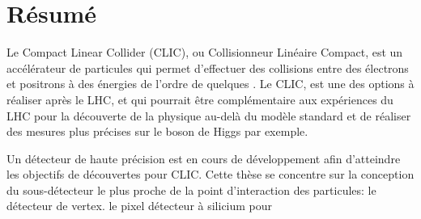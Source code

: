 \chapter*{Résumé}

Le Compact Linear Collider (CLIC), ou Collisionneur Linéaire Compact,
est un accélérateur de particules qui permet d'effectuer des
collisions entre des électrons et positrons à des énergies de l'ordre
de quelques \tev. Le CLIC, est une des options à réaliser après le
LHC, et qui pourrait être complémentaire aux expériences du LHC pour
la découverte de la physique au-delà du modèle standard et de réaliser
des mesures plus précises sur le boson de Higgs par exemple.

Un détecteur de haute précision est en cours de développement afin
d'atteindre les objectifs de découvertes pour CLIC. Cette thèse se
concentre sur la conception du sous-détecteur le plus proche de la
point d'interaction des particules: le détecteur de vertex. le pixel
détecteur à silicium pour
